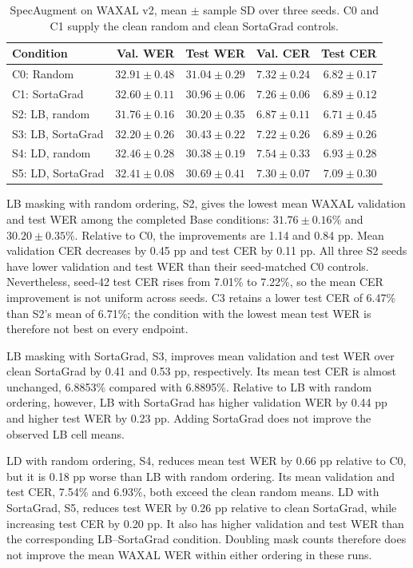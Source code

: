 \documentclass[12pt,a4paper]{report}
\begin{document}
\begin{table}[htbp]\centering\scriptsize
\caption{SpecAugment on WAXAL v2, mean $\pm$ sample SD over three seeds. C0 and C1 supply the clean random and clean SortaGrad controls.}\label{tab:results-specaug}
\setlength{\tabcolsep}{4pt}
\begin{tabular}{lrrrr}\toprule
Condition & Val. WER & Test WER & Val. CER & Test CER\\\midrule
C0: Random & $32.91 \pm 0.48$ & $31.04 \pm 0.29$ & $7.32 \pm 0.24$ & $6.82 \pm 0.17$ \\
C1: SortaGrad & $32.60 \pm 0.11$ & $30.96 \pm 0.06$ & $7.26 \pm 0.06$ & $6.89 \pm 0.12$ \\
S2: LB, random & $31.76 \pm 0.16$ & $30.20 \pm 0.35$ & $6.87 \pm 0.11$ & $6.71 \pm 0.45$ \\
S3: LB, SortaGrad & $32.20 \pm 0.26$ & $30.43 \pm 0.22$ & $7.22 \pm 0.26$ & $6.89 \pm 0.26$ \\
S4: LD, random & $32.46 \pm 0.28$ & $30.38 \pm 0.19$ & $7.54 \pm 0.33$ & $6.93 \pm 0.28$ \\
S5: LD, SortaGrad & $32.41 \pm 0.08$ & $30.69 \pm 0.41$ & $7.30 \pm 0.07$ & $7.09 \pm 0.30$ \\
\bottomrule\end{tabular}\end{table}

LB masking with random ordering, S2, gives the lowest mean WAXAL validation and test WER among the completed Base conditions: $31.76\pm0.16$\% and $30.20\pm0.35$\%. Relative to C0, the improvements are 1.14 and 0.84 pp. Mean validation CER decreases by 0.45 pp and test CER by 0.11 pp. All three S2 seeds have lower validation and test WER than their seed-matched C0 controls. Nevertheless, seed-42 test CER rises from 7.01\% to 7.22\%, so the mean CER improvement is not uniform across seeds. C3 retains a lower test CER of 6.47\% than S2's mean of 6.71\%; the condition with the lowest mean test WER is therefore not best on every endpoint.

LB masking with SortaGrad, S3, improves mean validation and test WER over clean SortaGrad by 0.41 and 0.53 pp, respectively. Its mean test CER is almost unchanged, 6.8853\% compared with 6.8895\%. Relative to LB with random ordering, however, LB with SortaGrad has higher validation WER by 0.44 pp and higher test WER by 0.23 pp. Adding SortaGrad does not improve the observed LB cell means.

LD with random ordering, S4, reduces mean test WER by 0.66 pp relative to C0, but it is 0.18 pp worse than LB with random ordering. Its mean validation and test CER, 7.54\% and 6.93\%, both exceed the clean random means. LD with SortaGrad, S5, reduces test WER by 0.26 pp relative to clean SortaGrad, while increasing test CER by 0.20 pp. It also has higher validation and test WER than the corresponding LB--SortaGrad condition. Doubling mask counts therefore does not improve the mean WAXAL WER within either ordering in these runs.
\end{document}
